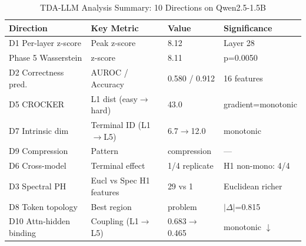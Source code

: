 \begin{table}[htbp]
\centering
\caption{TDA-LLM Analysis Summary: 10 Directions on Qwen2.5-1.5B}
\label{tab:tda-llm-summary}
\begin{tabular}{llll}
\toprule
Direction & Key Metric & Value & Significance \\
\midrule
D1 Per-layer z-score & Peak z-score & 8.12 & Layer 28 \\
Phase 5 Wasserstein & z-score & 8.11 & p=0.0050 \\
D2 Correctness pred. & AUROC / Accuracy & 0.580 / 0.912 & 16 features \\
D5 CROCKER & L1 dist (easy$\rightarrow$hard) & 43.0 & gradient=monotonic \\
D7 Intrinsic dim & Terminal ID (L1$\rightarrow$L5) & 6.7$\rightarrow$12.0 & monotonic \\
D9 Compression & Pattern & compression & --- \\
D6 Cross-model & Terminal effect & 1/4 replicate & H1 non-mono: 4/4 \\
D3 Spectral PH & Eucl vs Spec H1 features & 29 vs 1 & Euclidean richer \\
D8 Token topology & Best region & problem & $|\Delta|$=0.815 \\
D10 Attn-hidden binding & Coupling (L1$\rightarrow$L5) & 0.683$\rightarrow$0.465 & monotonic $\downarrow$ \\
\bottomrule
\end{tabular}
\end{table}